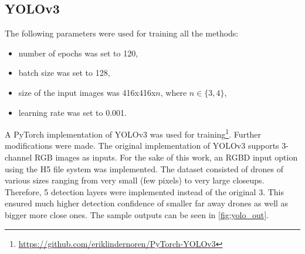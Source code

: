 \documentclass[twoside]{ctuthesis}
\theoremstyle{plain}
\theoremstyle{definition}
\theoremstyle{note}
\begin{document}
\subsection{YOLOv3}
The following parameters were used for training all the methods:
\begin{itemize}
	\item number of epochs was set to 120,
	\item batch size was set to 128,
	\item size of the input images was 416x416x$n$, where $n\in\{3,4\}$,
	\item learning rate was set to 0.001.
\end{itemize}
A PyTorch implementation of YOLOv3 was used for training\footnote{\url{https://github.com/eriklindernoren/PyTorch-YOLOv3}}. Further modifications were made. The original implementation of YOLOv3 supports 3-channel RGB images as inputs. For the sake of this work, an RGBD input option using the H5 file system was implemented. The dataset consisted of drones of various sizes ranging from very small (few pixels) to very large closeups. Therefore, 5 detection layers were implemented instead of the original 3. This ensured much higher detection confidence of smaller far away drones as well as bigger more close ones. The sample outputs can be seen in \autoref{fig:yolo_out}.
\end{document}
